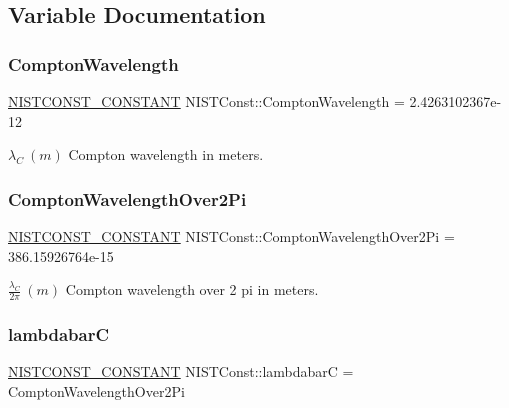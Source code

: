\subsection{Variable Documentation}
\mbox{\label{group___n_i_s_t_const-_compton_wavelength_ga9e52f9c08046cc0ec310fdf0137cdcda}} 
\subsubsection{\texorpdfstring{Compton\+Wavelength}{ComptonWavelength}}
{\footnotesize\ttfamily \mbox{\hyperlink{group___n_i_s_t_const-_macros_ga2b0fc1d7452373f816175dd86ce26729}{N\+I\+S\+T\+C\+O\+N\+S\+T\+\_\+\+C\+O\+N\+S\+T\+A\+NT}} N\+I\+S\+T\+Const\+::\+Compton\+Wavelength = 2.\+4263102367e-\/12}

$\lambda_C \ (m)$ Compton wavelength in meters. \mbox{\label{group___n_i_s_t_const-_compton_wavelength_gabba37dafb84b4faabc2d90a8a7d0ce2a}} 
\subsubsection{\texorpdfstring{Compton\+Wavelength\+Over2\+Pi}{ComptonWavelengthOver2Pi}}
{\footnotesize\ttfamily \mbox{\hyperlink{group___n_i_s_t_const-_macros_ga2b0fc1d7452373f816175dd86ce26729}{N\+I\+S\+T\+C\+O\+N\+S\+T\+\_\+\+C\+O\+N\+S\+T\+A\+NT}} N\+I\+S\+T\+Const\+::\+Compton\+Wavelength\+Over2\+Pi = 386.\+15926764e-\/15}

$\frac{\lambda_C}{2\pi} \ (m)$ Compton wavelength over 2 pi in meters. \mbox{\label{group___n_i_s_t_const-_compton_wavelength_ga88ba617a2d5943169f5b1bec003c07ad}} 
\subsubsection{\texorpdfstring{lambdabarC}{lambdabarC}}
{\footnotesize\ttfamily \mbox{\hyperlink{group___n_i_s_t_const-_macros_ga2b0fc1d7452373f816175dd86ce26729}{N\+I\+S\+T\+C\+O\+N\+S\+T\+\_\+\+C\+O\+N\+S\+T\+A\+NT}} N\+I\+S\+T\+Const\+::lambdabarC = Compton\+Wavelength\+Over2\+Pi}

